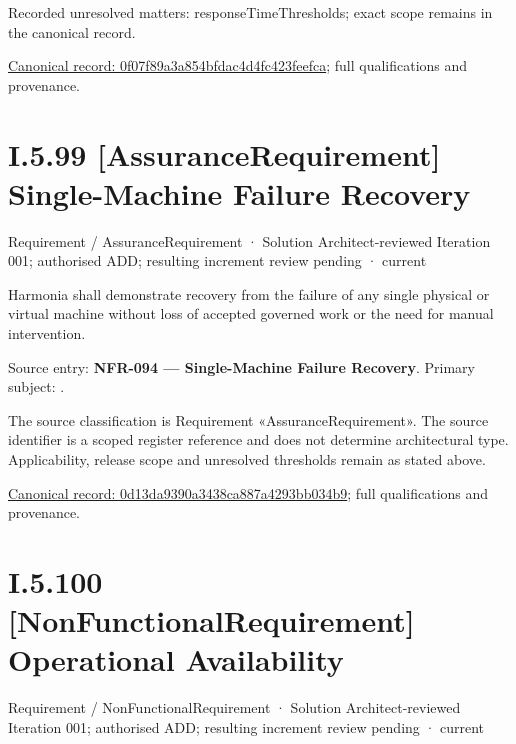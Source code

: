 {\small Recorded unresolved matters: responseTimeThresholds; exact scope remains in the canonical record.}\par
{\footnotesize \href{../../../../../../../continuum/motivation/requirement/non-functional-requirement/0f07f89a3a854bfdac4d4fc423feefca.md}{Canonical record: 0f07f89a3a854bfdac4d4fc423feefca}; full qualifications and provenance.}\par
\section*{I.5.99 [AssuranceRequirement] Single-Machine Failure Recovery}
\label{navigation:I.5.99}

\label{element:0d13da9390a3438ca887a4293bb034b9}
{\small Requirement / AssuranceRequirement · Solution Architect-reviewed Iteration 001; authorised ADD; resulting increment review pending · current}\par

Harmonia shall demonstrate recovery from the failure of any single physical or virtual machine without loss of accepted governed work or the need for manual intervention.



Source entry: \textbf{NFR-094 — Single-Machine Failure Recovery}. Primary subject: \texttt{}.



The source classification is Requirement «AssuranceRequirement». The source identifier is a scoped register reference and does not determine architectural type. Applicability, release scope and unresolved thresholds remain as stated above.


{\footnotesize \href{../../../../../../../continuum/motivation/requirement/assurance-requirement/0d13da9390a3438ca887a4293bb034b9.md}{Canonical record: 0d13da9390a3438ca887a4293bb034b9}; full qualifications and provenance.}\par
\section*{I.5.100 [NonFunctionalRequirement] Operational Availability}
\label{navigation:I.5.100}

\label{element:65ac0367b7f241149ad1839032004039}
{\small Requirement / NonFunctionalRequirement · Solution Architect-reviewed Iteration 001; authorised ADD; resulting increment review pending · current}\par

